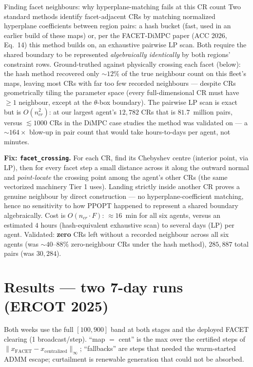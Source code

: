 \documentclass[11pt, letterpaper]{article}
\begin{document}
\begin{keybox}{Finding facet neighbours: why hyperplane-matching fails at this CR count}
Two standard methods identify facet-adjacent CRs by matching normalized hyperplane coefficients
between region pairs: a hash bucket (fast, used in an earlier build of these maps) or, per the
FACET-DiMPC paper (ACC 2026, Eq.~14) this method builds on, an exhaustive pairwise LP scan. Both
require the shared boundary to be represented \emph{algebraically identically} by both regions'
constraint rows. Ground-truthed against physically crossing each facet (below): the hash method
recovered only $\sim\!12\%$ of the true neighbour count on this fleet's maps, leaving most CRs with
far too few recorded neighbours --- despite CRs geometrically tiling the parameter space (every
full-dimensional CR must have $\ge1$ neighbour, except at the $\theta$-box boundary). The pairwise
LP scan is exact but is $O(n_{cr}^2)$: at our largest agent's $12{,}782$ CRs that is $81.7$~million
pairs, versus $\lesssim\!1000$ CRs in the DiMPC case studies the method was validated on --- a
$\sim\!164\times$ blow-up in pair count that would take hours-to-days per agent, not minutes.

\textbf{Fix: \texttt{facet\_crossing}.} For each CR, find its Chebyshev centre (interior point, via
LP), then for every facet step a small distance across it along the outward normal and
\emph{point-locate} the crossing point among the agent's other CRs (the same vectorized machinery
Tier 1 uses). Landing strictly inside another CR proves a genuine neighbour by direct construction
--- no hyperplane-coefficient matching, hence no sensitivity to how PPOPT happened to represent a
shared boundary algebraically. Cost is $O(n_{cr}\cdot F)$: $\approx\!16$~min for all six agents,
versus an estimated $4$ hours (hash-equivalent exhaustive scan) to several days (LP) per agent.
Validated: \textbf{zero} CRs left without a recorded neighbour across all six agents (was
$\sim\!40$--$88\%$ zero-neighbour CRs under the hash method), $285{,}887$ total pairs (was $30{,}284$).
\end{keybox}

\section{Results --- two 7-day runs (ERCOT 2025)}
Both weeks use the full $[100,900]$ band at both stages and the deployed FACET clearing
(1 broadcast/step). ``map $=$ cent'' is the max over the certified steps of
$\|x_{\mathrm{FACET}}-x_{\mathrm{centralized}}\|_\infty$; ``fallbacks'' are steps that needed the
warm-started ADMM escape; curtailment is renewable generation that could not be absorbed.
\end{document}
